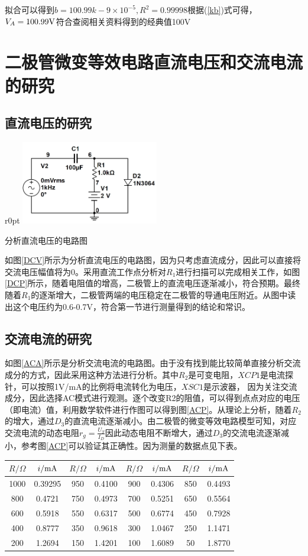 \documentclass[UTF8,a4paper]{ctexart}
\begin{document}
拟合可以得到$b=100.99k-9\times 10^{-5},R^2=0.99998$根据(\ref{kb})式可得，$V_A=100.99 \rm{V}$符合查阅相关资料得到的经典值100V

\section{二极管微变等效电路直流电压和交流电流的研究}
\subsection{直流电压的研究}
\begin {wrapfigure}{r}{0pt}
\includegraphics [width=60mm]{cap/10.JPG}
\caption{分析直流电压的电路图}
\label{DCV}
\end {wrapfigure}
如图\ref{DCV}所示为分析直流电压的电路图，因为只考虑直流成分，因此可以直接将交流电压幅值将为0。采用直流工作点分析对$R_1$进行扫描可以完成相关工作，如图\ref{DCP}所示，随着电阻值的增高，二极管上的直流电压逐渐减小，符合预期。最终随着$R_1$的逐渐增大，二极管两端的电压稳定在二极管的导通电压附近。从图中读出这个电压约为0.6-0.7V，符合第一节进行测量得到的结论和常识。


\subsection{交流电流的研究}

如图\ref{ACA}所示是分析交流电流的电路图。由于没有找到能比较简单直接分析交流成分的方式，因此采用这种方法进行分析。其中$R_2$是可变电阻，$XCP1$是电流探针，可以按照1V/mA的比例将电流转化为电压，$XSC1$是示波器， 因为关注交流成分，因此选择AC模式进行观测。逐个改变R2的阻值，可以得到点点对应的电压（即电流）值，利用数学软件进行作图可以得到图\ref{ACP}。从理论上分析，随着$R_2$的增大，通过$D_3$的直流电流逐渐减小。由二极管的微变等效电路模型可知，对应交流电流的动态电阻$r_g=\frac{U_T}{I_D}$因此动态电阻不断增大，通过$D_3$的交流电流逐渐减小，参考图\ref{ACP}可以验证其正确性。因为测量的数据点见下表。\\

\begin{tabular}{|c|c|c|c|c|c|c|c|}
\hline
$R/\Omega$&$i/\rm{mA}$&$R/\Omega$&$i/\rm{mA}$&$R/\Omega$&$i/\rm{mA}$&$R/\Omega$&$i/\rm{mA}$\\
\hline
1000&0.39295&950&0.4100&900&0.4306&850&0.4493\\
\hline
800&0.4721&750&0.4973&700&0.5251&650&0.5564\\
\hline
600&0.5918&550&0.6317&500&0.6774&450&0.7928\\
\hline
400&0.8777&350&0.9618&300&1.0467&250&1.1471\\
\hline
200&1.2694&150&1.4201&100&1.6089&50&1.8770\\
\hline
\end{tabular}
\end{document}
